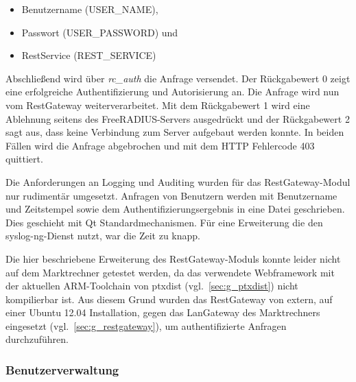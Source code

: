 \documentclass[11pt,a4paper]{report}
\begin{document}
\begin{itemize}
\item Benutzername (USER\_NAME),
\item Passwort (USER\_PASSWORD) und
\item RestService (REST\_SERVICE)
\end{itemize}

Abschließend wird über \textit{rc\_auth} die Anfrage versendet. Der Rückgabewert 0 zeigt eine erfolgreiche Authentifizierung und Autorisierung an. Die Anfrage wird nun vom RestGateway weiterverarbeitet. Mit dem Rückgabewert 1 wird eine Ablehnung seitens des FreeRADIUS-Servers ausgedrückt und der Rückgabewert 2 sagt aus, dass keine Verbindung zum Server aufgebaut werden konnte. In beiden Fällen wird die Anfrage abgebrochen und mit dem HTTP Fehlercode 403 quittiert.

Die Anforderungen an Logging und Auditing wurden für das RestGateway-Modul nur rudimentär umgesetzt. Anfragen von Benutzern werden mit Benutzername und Zeitstempel sowie dem Authentifizierungsergebnis in eine Datei geschrieben. Dies geschieht mit Qt Standardmechanismen. Für eine Erweiterung die den syslog-ng-Dienst nutzt, war die Zeit zu knapp.

Die hier beschriebene Erweiterung des RestGateway-Moduls konnte leider nicht auf dem Marktrechner getestet werden, da das verwendete Webframework mit der aktuellen ARM-Toolchain von ptxdist (vgl.~\ref{sec:g_ptxdist}) nicht kompilierbar ist. Aus diesem Grund wurden das RestGateway von extern, auf einer Ubuntu 12.04 Installation, gegen das LanGateway des Marktrechners eingesetzt (vgl.~\ref{sec:g_restgateway}), um authentifizierte Anfragen durchzuführen.

\subsubsection{Benutzerverwaltung}
\end{document}
